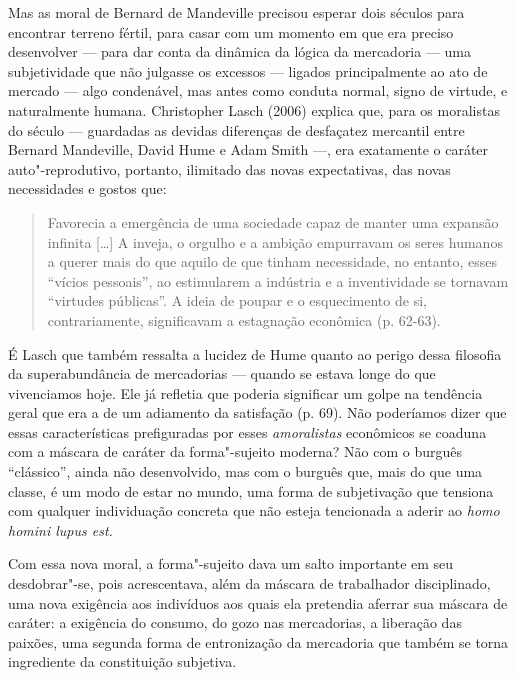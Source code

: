 Mas as moral de Bernard de Mandeville precisou esperar dois séculos para
encontrar terreno fértil, para casar com um momento em que era preciso
desenvolver --- para dar conta da dinâmica da lógica da mercadoria ---
uma subjetividade que não julgasse os excessos --- ligados
principalmente ao ato de mercado --- algo condenável, mas antes como
conduta normal, signo de virtude, e naturalmente humana. Christopher
Lasch (2006) explica que, para os moralistas do século  ---
guardadas as devidas diferenças de desfaçatez mercantil entre Bernard
Mandeville, David Hume e Adam Smith ---, era exatamente o caráter
auto"-reprodutivo, portanto, ilimitado das novas expectativas, das novas
necessidades e gostos que:

\begin{quote}
Favorecia a emergência de uma sociedade capaz de manter uma expansão
infinita [\ldots{}] A inveja, o orgulho e a ambição empurravam os seres
humanos a querer mais do que aquilo de que tinham necessidade, no
entanto, esses ``vícios pessoais'', ao estimularem a indústria e a
inventividade se tornavam ``virtudes públicas''. A ideia de poupar e o
esquecimento de si, contrariamente, significavam a estagnação econômica
(p. 62-63).
\end{quote}

É Lasch que também ressalta a lucidez de Hume quanto ao perigo dessa
filosofia da superabundância de mercadorias --- quando se estava longe
do que vivenciamos hoje. Ele já refletia que poderia significar um golpe
na tendência geral que era a de um adiamento da satisfação (p. 69). Não
poderíamos dizer que essas características prefiguradas por esses
\emph{amoralistas} econômicos se coaduna com a máscara de caráter da
forma"-sujeito moderna? Não com o burguês ``clássico'', ainda não
desenvolvido, mas com o burguês que, mais do que uma classe, é um modo
de estar no mundo, uma forma de subjetivação que tensiona com qualquer
individuação concreta que não esteja tencionada a aderir ao \emph{homo
homini lupus est.}

Com essa nova moral, a forma"-sujeito dava um salto importante em seu
desdobrar"-se, pois acrescentava, além da máscara de trabalhador
disciplinado, uma nova exigência aos indivíduos aos quais ela pretendia
aferrar sua máscara de caráter: a exigência do consumo, do gozo nas
mercadorias, a liberação das paixões, uma segunda forma de entronização
da mercadoria que também se torna ingrediente da constituição subjetiva.

